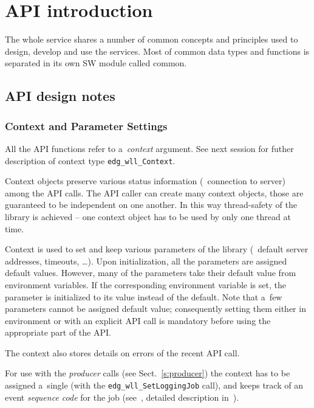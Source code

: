 
\section{\LB API introduction}



The whole \LB service shares a number of common concepts and
principles used to design, develop and use the services. Most of
common data types and functions is separated in its own SW module called
\LB common.

\subsection{\LB API design notes}

\subsubsection{Context and Parameter Settings}
\label{s:context}

All the API functions refer to a~\emph{context} argument. See next
session for futher description of context type \verb'edg_wll_Context'.

Context objects preserve various status information
(\eg\ connection to server) among the API calls.
The API caller can create many context objects, those are guaranteed
to be independent on one another.
In this way thread-safety of the library is achieved --
one context object has to be used by only one thread at time.

Context is used to set and keep various parameters of the library
(\eg\ default server addresses, timeouts, \dots).
Upon initialization, all the parameters are assigned default values.
However, many of the parameters take their default value from environment
variables. If the corresponding environment variable is set,
the parameter is initialized to its value instead of the default.
Note that a~few parameters cannot be assigned default value; consequently
setting them either in environment or with an explicit API call
is mandatory before using the appropriate part of the API.

The context also stores details on errors of the recent API call.

For use with the \emph{producer} calls (see Sect.~\ref{s:producer})
the context has to be assigned a~single \jobid
(with the \verb'edg_wll_SetLoggingJob' call),
and keeps track of an event \emph{sequence code} for the job 
(see~\cite{LBUG}, detailed description in~\cite{lbarch}).


